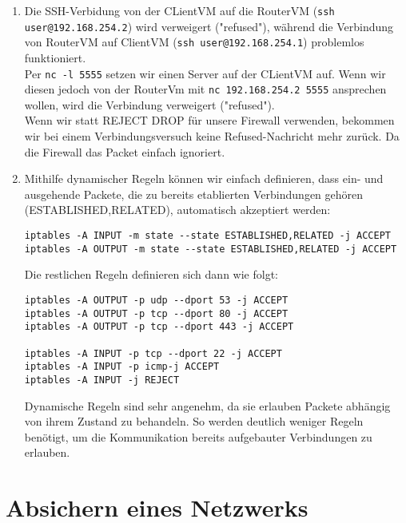 \documentclass{scrartcl}
\begin{document}
\begin{enumerate}[\bfseries 1.]
        \item
                Die SSH-Verbidung von der CLientVM auf die RouterVM
                      (\texttt{ssh user@192.168.254.2}) wird verweigert ("refused"),
                      während die Verbindung von RouterVM auf ClientVM
                      (\texttt{ssh user@192.168.254.1}) problemlos funktioniert.\\
                Per \texttt{nc -l 5555} setzen wir einen Server auf der CLientVM
                      auf. Wenn wir diesen jedoch von der RouterVm mit
                      \texttt{nc 192.168.254.2 5555} ansprechen wollen, wird die
                      Verbindung verweigert ("refused").\\
                Wenn wir statt REJECT DROP für unsere Firewall verwenden,
                      bekommen wir bei einem Verbindungsversuch keine Refused-Nachricht
                      mehr zurück. Da die Firewall das Packet einfach ignoriert.

        \item Mithilfe dynamischer Regeln können wir einfach definieren, dass ein- und
              ausgehende Packete, die zu bereits etablierten Verbindungen gehören
              (ESTABLISHED,RELATED), automatisch akzeptiert werden:
              \begin{lstlisting}
iptables -A INPUT -m state --state ESTABLISHED,RELATED -j ACCEPT
iptables -A OUTPUT -m state --state ESTABLISHED,RELATED -j ACCEPT
              \end{lstlisting}
              Die restlichen Regeln definieren sich dann wie folgt:
              \begin{lstlisting}[]
iptables -A OUTPUT -p udp --dport 53 -j ACCEPT
iptables -A OUTPUT -p tcp --dport 80 -j ACCEPT
iptables -A OUTPUT -p tcp --dport 443 -j ACCEPT

iptables -A INPUT -p tcp --dport 22 -j ACCEPT
iptables -A INPUT -p icmp-j ACCEPT
iptables -A INPUT -j REJECT
              \end{lstlisting}
              Dynamische Regeln sind sehr angenehm, da sie erlauben Packete abhängig
              von ihrem Zustand zu behandeln. So werden deutlich weniger Regeln benötigt,
              um die Kommunikation bereits aufgebauter Verbindungen zu erlauben.
\end{enumerate}

  \section{Absichern eines Netzwerks}
  \label{sec:Absichern eines Netzwerks}
\end{document}
